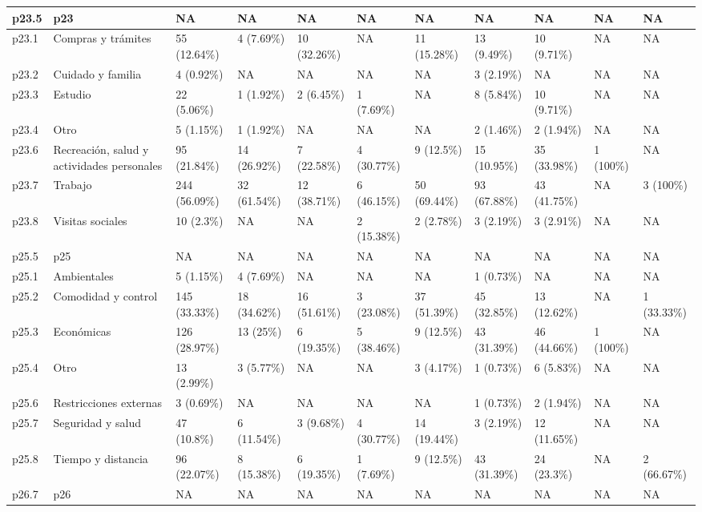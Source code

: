 \begin{table}
{\begin{tabular}[t]{l|l|l|l|l|l|l|l|l|l|l}
\hline
p23.5 & p23 & NA & NA & NA & NA & NA & NA & NA & NA & NA\\
\hline
p23.1 & Compras y trámites & 55 (12.64\%) & 4 (7.69\%) & 10 (32.26\%) & NA & 11 (15.28\%) & 13 (9.49\%) & 10 (9.71\%) & NA & NA\\
\hline
p23.2 & Cuidado y familia & 4 (0.92\%) & NA & NA & NA & NA & 3 (2.19\%) & NA & NA & NA\\
\hline
p23.3 & Estudio & 22 (5.06\%) & 1 (1.92\%) & 2 (6.45\%) & 1 (7.69\%) & NA & 8 (5.84\%) & 10 (9.71\%) & NA & NA\\
\hline
p23.4 & Otro & 5 (1.15\%) & 1 (1.92\%) & NA & NA & NA & 2 (1.46\%) & 2 (1.94\%) & NA & NA\\
\hline
p23.6 & Recreación, salud y actividades personales & 95 (21.84\%) & 14 (26.92\%) & 7 (22.58\%) & 4 (30.77\%) & 9 (12.5\%) & 15 (10.95\%) & 35 (33.98\%) & 1 (100\%) & NA\\
\hline
p23.7 & Trabajo & 244 (56.09\%) & 32 (61.54\%) & 12 (38.71\%) & 6 (46.15\%) & 50 (69.44\%) & 93 (67.88\%) & 43 (41.75\%) & NA & 3 (100\%)\\
\hline
p23.8 & Visitas sociales & 10 (2.3\%) & NA & NA & 2 (15.38\%) & 2 (2.78\%) & 3 (2.19\%) & 3 (2.91\%) & NA & NA\\
\hline
p25.5 & p25 & NA & NA & NA & NA & NA & NA & NA & NA & NA\\
\hline
p25.1 & Ambientales & 5 (1.15\%) & 4 (7.69\%) & NA & NA & NA & 1 (0.73\%) & NA & NA & NA\\
\hline
p25.2 & Comodidad y control & 145 (33.33\%) & 18 (34.62\%) & 16 (51.61\%) & 3 (23.08\%) & 37 (51.39\%) & 45 (32.85\%) & 13 (12.62\%) & NA & 1 (33.33\%)\\
\hline
p25.3 & Económicas & 126 (28.97\%) & 13 (25\%) & 6 (19.35\%) & 5 (38.46\%) & 9 (12.5\%) & 43 (31.39\%) & 46 (44.66\%) & 1 (100\%) & NA\\
\hline
p25.4 & Otro & 13 (2.99\%) & 3 (5.77\%) & NA & NA & 3 (4.17\%) & 1 (0.73\%) & 6 (5.83\%) & NA & NA\\
\hline
p25.6 & Restricciones externas & 3 (0.69\%) & NA & NA & NA & NA & 1 (0.73\%) & 2 (1.94\%) & NA & NA\\
\hline
p25.7 & Seguridad y salud & 47 (10.8\%) & 6 (11.54\%) & 3 (9.68\%) & 4 (30.77\%) & 14 (19.44\%) & 3 (2.19\%) & 12 (11.65\%) & NA & NA\\
\hline
p25.8 & Tiempo y distancia & 96 (22.07\%) & 8 (15.38\%) & 6 (19.35\%) & 1 (7.69\%) & 9 (12.5\%) & 43 (31.39\%) & 24 (23.3\%) & NA & 2 (66.67\%)\\
\hline
p26.7 & p26 & NA & NA & NA & NA & NA & NA & NA & NA & NA\\

\end{tabular}}
\end{table}
